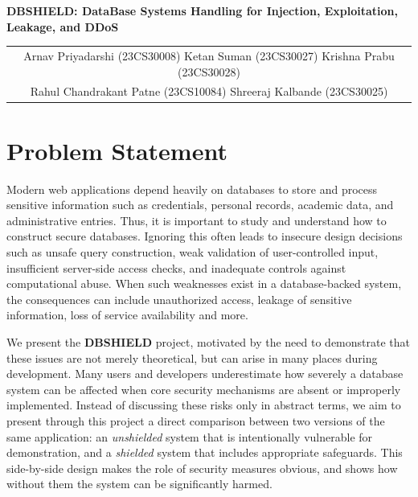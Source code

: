 \documentclass[11pt,a4paper]{article}
\title{}
\author{}
\date{}
\newcommand{\TitleFont}{\fontsize{15.5}{17.5}\selectfont}
\begin{document}
\begin{center}
{\TitleFont\bfseries
DBSHIELD: DataBase Systems Handling for Injection, Exploitation, Leakage, and DDoS
\par}

\vspace{0.65em}

{\small
\begin{tabular}{c}
Arnav Priyadarshi (23CS30008) \quad
Ketan Suman (23CS30027) \quad
Krishna Prabu (23CS30028) \\[0.25em]
Rahul Chandrakant Patne (23CS10084) \quad
Shreeraj Kalbande (23CS30025) \\[0.35em]
\end{tabular}
\par}

\vspace{0.7em}
\end{center}

\section{Problem Statement}

Modern web applications depend heavily on databases to store and process sensitive information such as credentials, personal records, academic data, and administrative entries. Thus, it is important to study and understand how to construct secure databases. Ignoring this often leads to insecure design decisions such as unsafe query construction, weak validation of user-controlled input, insufficient server-side access checks, and inadequate controls against computational abuse. When such weaknesses exist in a database-backed system, the consequences can include unauthorized access, leakage of sensitive information, loss of service availability and more.

We present the \textbf{DBSHIELD} project, motivated by the need to demonstrate that these issues are not merely theoretical, but can arise in many places during development. Many users and developers underestimate how severely a database system can be affected when core security mechanisms are absent or improperly implemented. Instead of discussing these risks only in abstract terms, we aim to present through this project a direct comparison between two versions of the same application: an \textit{unshielded} system that is intentionally vulnerable for demonstration, and a \textit{shielded} system that includes appropriate safeguards. This side-by-side design makes the role of security measures obvious, and shows how without them the system can be significantly harmed.
\end{document}
